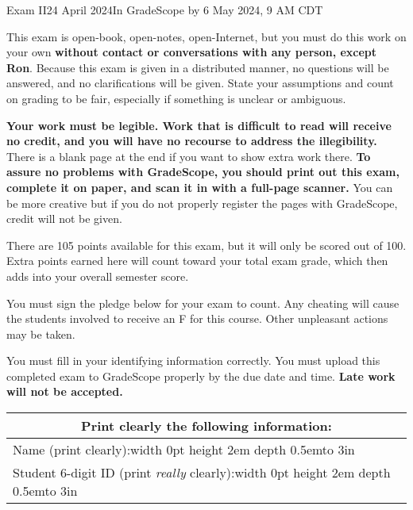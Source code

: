 \documentclass[12pt]{article}
\def\Tall{\vrule width 0pt height 2em depth 0.5em}
\begin{document}
\def\TensOp{\ensuremath{\bm{\otimes}}}
\def\TensProd#1#2{\ensuremath{#1 \TensOp{} #2}}
\def\RootN#1{\RootUN{1}{#1}}
\def\RootUN#1#2{\ensuremath{\frac{#1}{\sqrt{#2}}}}
\def\RootTwo{\RootN{2}}
\def\ExpVal#1#2{\ensuremath{\bra{#2}#1\ket{#2}}}

\begin{assignment}{Exam II}{24 April 2024}{In GradeScope by 6 May 2024, 9 AM CDT}

{\small {\large {}}
This exam is open-book, open-notes, open-Internet, but you must do this
work on your own \textbf{without contact or conversations with any person, except Ron}.  
Because this exam is given in a distributed manner, no questions will be answered, and no clarifications will be given.  State your assumptions and count on grading to be fair, especially if something is unclear or ambiguous.


\textbf{Your work must be legible.  Work that is
difficult to read will receive no credit, and you will have no recourse to address the illegibility.}  There is a blank page at the end
if you want to show extra work there.  \textbf{To assure no problems with GradeScope,
you should
print out this exam, complete it on paper, and scan it in with a full-page
scanner.}  You can be more creative but if you do not properly register the
pages with GradeScope, credit will not be given.

There are 105 points available for this exam, but it will only be scored out of 100.  Extra points earned here will count toward your total exam grade, which then adds into your overall semester score.

You must sign the pledge below for your exam to count.  Any cheating will
cause the students involved to receive an F for this course. Other unpleasant
actions
may be taken.

You must fill in your identifying information correctly.  You must upload this
completed exam to GradeScope properly by the due date and time.  \textbf{Late work will not be accepted.}
}

\begin{center}\large
\begin{tabular}{|c|c|c|} \hline
\multicolumn{3}{|c|}{{\bf Print  clearly} the following information:}  \\ \hline
\multicolumn{3}{|l|}{Name (print clearly):\Tall{}\hbox to 3in{\hss}}  \\ \hline
\multicolumn{3}{|l|}{Student 6-digit ID (print {\it really} clearly):\Tall{}\hbox to 3in{\hss}} \\ \hline
\end{tabular}
\end{center}


\end{assignment}
\end{document}
